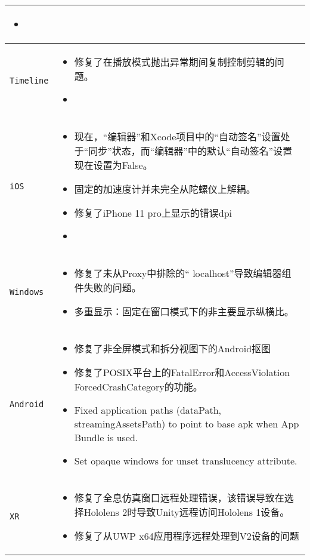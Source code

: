 \documentclass[UTF8,a4paper,12pt]{ctexart}
\begin{document}
\begin{longtable}{p{2cm}|p{14cm}}
\begin{itemize}
											\item 
											\end{itemize}			\\
				\hline
				\verb|Timeline| & 		
											\begin{itemize}
											\item 修复了在播放模式抛出异常期间复制控制剪辑的问题。
											\item 
											\end{itemize}			\\
				\hline
				\verb|iOS| & 		
											\begin{itemize}
											\item 现在，“编辑器”和Xcode项目中的“自动签名”设置处于“同步”状态，而“编辑器”中的默认“自动签名”设置现在设置为False。
											\item 固定的加速度计并未完全从陀螺仪上解耦。
											\item 修复了iPhone 11 pro上显示的错误dpi
											\item 
											\end{itemize}			\\											
				\hline
				\verb|Windows| &	
											\begin{itemize}
											\item 修复了未从Proxy中排除的“ localhost”导致编辑器组件失败的问题。
											\item 多重显示：固定在窗口模式下的非主要显示纵横比。
											\end{itemize}			\\
				\hline
				\verb|Android| & 	
											\begin{itemize}
												\item 修复了非全屏模式和拆分视图下的Android抠图
												\item 修复了POSIX平台上的FatalError和AccessViolation ForcedCrashCategory的功能。
												\item Fixed application paths (dataPath, streamingAssetsPath) to point to base apk when App Bundle is used.
												\item Set opaque windows for unset translucency attribute. 
											\end{itemize}		\\											
				\hline
				\verb|XR |  &	
											\begin{itemize}
											\item 修复了全息仿真窗口远程处理错误，该错误导致在选择Hololens 2时导致Unity远程访问Hololens 1设备。
											\item 修复了从UWP x64应用程序远程处理到V2设备的问题
											\end{itemize}			\\
																																				
			\bottomrule
		\end{longtable}
\end{document}
